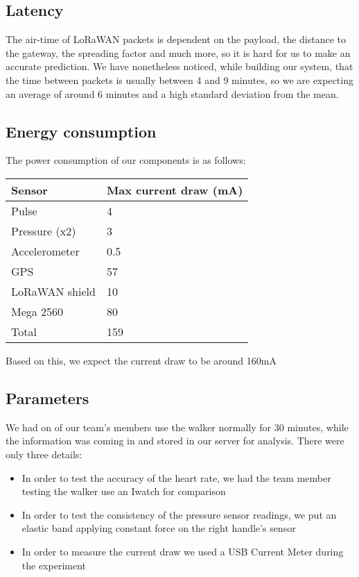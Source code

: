 		\subsection{Latency}
			The air-time of LoRaWAN packets is dependent on the payload, the distance to the gateway, the spreading factor and much more, so it is hard for us to make an accurate prediction. We have nonetheless noticed, while building our system, that the time between packets is usually between 4 and 9 minutes, so we are expecting an average of around 6 minutes and a high standard deviation from the mean.
		\newline
		\newline
		\newline
		\subsection{Energy consumption}
			The power consumption of our components is as follows:

			\begin{table}[h]
				\begin{tabular}{@{}ll@{}}
					\toprule
					Sensor         & Max current draw (mA) \\ \midrule
					Pulse          & 4                     \\
					Pressure (x2)  & 3                     \\
					Accelerometer  & 0.5                   \\
					GPS            & 57                    \\
					LoRaWAN shield & 10                    \\
					Mega 2560      & 80                    \\
					Total          & 159                   \\ \bottomrule
				\end{tabular}
			\end{table}

			Based on this, we expect the current draw to be around 160mA

	\subsection{Parameters}
		We had on of our team's members use the walker normally for 30 minutes, while the information was coming in and stored in our server for analysis. There were only three details:

		\begin{itemize}
		  \item In order to test the accuracy of the heart rate, we had the team member testing the walker use an Iwatch for comparison
		  \item In order to test the consistency of the pressure sensor readings, we put an elastic band applying constant force on the right handle's sensor
		  \item In order to measure the current draw we used a USB Current Meter during the experiment
		\end{itemize}

